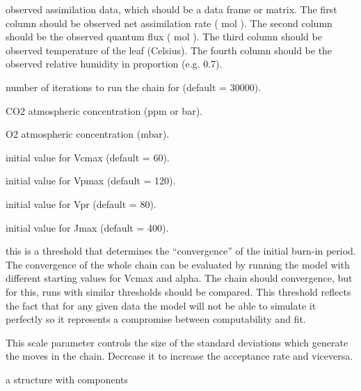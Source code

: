 \documentclass[letterpaper]{book}
\begin{document}
\begin{Arguments}
\begin{ldescription}
\item[\code{obsDat}] observed assimilation data, which should be
a data frame or matrix.  The first column should be
observed net assimilation rate (\eqn{\mu}{} mol
 ).  The second column should be
the observed quantum flux (\eqn{\mu}{} mol 
).  The third column should be observed
temperature of the leaf (Celsius).  The fourth column
should be the observed relative humidity in proportion
(e.g. 0.7).

\item[\code{niter}] number of iterations to run the chain for
(default = 30000).

\item[\code{iCa}] CO2 atmospheric concentration (ppm or
\eqn{\mu}{}bar).

\item[\code{iOa}] O2 atmospheric concentration (mbar).

\item[\code{iVcmax}] initial value for Vcmax (default = 60).

\item[\code{iVpmax}] initial value for Vpmax (default = 120).

\item[\code{iVpr}] initial value for Vpr (default = 80).

\item[\code{iJmax}] initial value for Jmax (default = 400).

\item[\code{thresh}] this is a threshold that determines the
``convergence'' of the initial burn-in period. The
convergence of the whole chain can be evaluated by
running the model with different starting values for
Vcmax and alpha. The chain should convergence, but for
this, runs with similar thresholds should be compared.
This threshold reflects the fact that for any given data
the model will not be able to simulate it perfectly so it
represents a compromise between computability and fit.

\item[\code{scale}] This scale parameter controls the size of
the standard deviations which generate the moves in the
chain. Decrease it to increase the acceptance rate and
viceversa.
\end{ldescription}
\end{Arguments}
%
\begin{Value}
a  structure with components
\end{Value}
\end{document}
